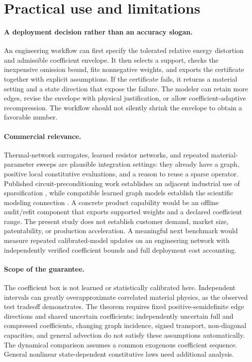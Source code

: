 \documentclass[11pt]{article}
\begin{document}
\section{Practical use and limitations}
\paragraph{A deployment decision rather than an accuracy slogan.}
An engineering workflow can first specify the tolerated relative energy distortion and admissible coefficient envelope. It then selects a support, checks the inexpensive omission bound, fits nonnegative weights, and exports the certificate together with explicit assumptions. If the certificate fails, it returns a material setting and a state direction that expose the failure. The modeler can retain more edges, revise the envelope with physical justification, or allow coefficient-adaptive recompression. The workflow should not silently shrink the envelope to obtain a favorable number.

\paragraph{Commercial relevance.}
Thermal-network surrogates, learned resistor networks, and repeated material-parameter sweeps are plausible integration settings: they already have a graph, positive local constitutive evaluations, and a reason to reuse a sparse operator. Published circuit-preconditioning work establishes an adjacent industrial use of sparsification \cite{zhao}, while compatible learned graph models establish the scientific modeling connection \cite{trask}. A concrete product capability would be an offline audit/refit component that exports supported weights and a declared coefficient range. The present study does not establish customer demand, market size, patentability, or production acceleration. A meaningful next benchmark would measure repeated calibrated-model updates on an engineering network with independently verified coefficient bounds and full deployment cost accounting.

\paragraph{Scope of the guarantee.}
The coefficient box is not learned or statistically calibrated here. Independent intervals can greatly overapproximate correlated material physics, as the observed test tradeoff demonstrates. The theorem requires fixed positive-semidefinite edge directions and shared uncertain coefficients; independently uncertain full and compressed coefficients, changing graph incidence, signed transport, non-diagonal capacities, and general advection do not satisfy these assumptions automatically. The dynamical comparison assumes a common exogenous coefficient sequence. General nonlinear state-dependent constitutive laws need additional analysis.
\end{document}
